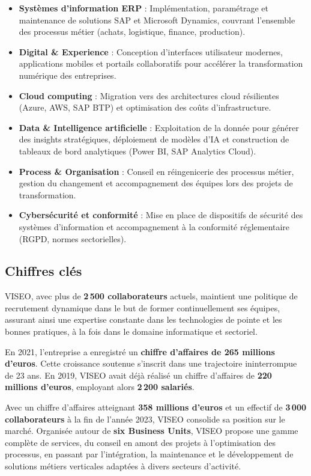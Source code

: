 \documentclass[12pt,a4paper,oneside]{report}
\begin{document}
\begin{itemize}[label=\textbullet, itemsep=0.2em]
	\item \textbf{Syst\`emes d'information ERP} : Impl\'ementation, param\'etrage et maintenance de solutions SAP et Microsoft Dynamics, couvrant l'ensemble des processus m\'etier (achats, logistique, finance, production).
	\item \textbf{Digital \& Experience} : Conception d'interfaces utilisateur modernes, applications mobiles et portails collaboratifs pour acc\'el\'erer la transformation num\'erique des entreprises.
	\item \textbf{Cloud computing} : Migration vers des architectures cloud r\'esilientes (Azure, AWS, SAP BTP) et optimisation des co\^uts d'infrastructure.
	\item \textbf{Data \& Intelligence artificielle} : Exploitation de la donn\'ee pour g\'en\'erer des insights strat\'egiques, d\'eploiement de mod\`eles d'IA et construction de tableaux de bord analytiques (Power BI, SAP Analytics Cloud).
	\item \textbf{Process \& Organisation} : Conseil en r\'eingenicerie des processus m\'etier, gestion du changement et accompagnement des \'equipes lors des projets de transformation.
	\item \textbf{Cybersécurité et conformité} : Mise en place de dispositifs de s\'ecurit\'e des syst\`emes d'information et accompagnement \`a la conformit\'e r\'eglementaire (RGPD, normes sectorielles).
\end{itemize}

\subsection{Chiffres cl\'es}\label{ch1:chiffres}

VISEO, avec plus de \textbf{2\,500 collaborateurs} actuels, maintient une politique de recrutement
dynamique dans le but de former continuellement ses \'equipes, assurant ainsi une expertise constante
dans les technologies de pointe et les bonnes pratiques, \`a la fois dans le domaine informatique
et sectoriel.

En 2021, l'entreprise a enregistr\'e un \textbf{chiffre d'affaires de 265 millions d'euros}.
Cette croissance soutenue s'inscrit dans une trajectoire ininterrompue de 23 ans. En 2019,
VISEO avait d\'ej\`a r\'ealis\'e un chiffre d'affaires de \textbf{220 millions d'euros}, employant
alors \textbf{2\,200 salari\'es}.

Avec un chiffre d'affaires atteignant \textbf{358 millions d'euros} et un effectif de
\textbf{3\,000 collaborateurs} \`a la fin de l'ann\'ee 2023, VISEO consolide sa position sur
le march\'e. Organis\'ee autour de \textbf{six Business Units}, VISEO propose une gamme compl\`ete
de services, du conseil en amont des projets \`a l'optimisation des processus, en passant par
l'int\'egration, la maintenance et le d\'eveloppement de solutions m\'etiers verticales adapt\'ees
\`a divers secteurs d'activit\'e.
\end{document}
